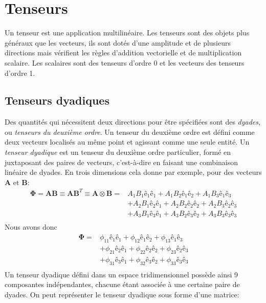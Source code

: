 \section{Tenseurs}
Un tenseur est une application multilinéaire. Les tenseurs sont des objets plus généraux que les vecteurs, ils sont dotés d'une amplitude et de plusieurs directions mais vérifient les règles d'addition vectorielle et de multiplication scalaire. Les scalaires sont des tenseurs d'ordre 0 et les vecteurs des tenseurs d'ordre 1.
\subsection{Tenseurs dyadiques}
Des quantités qui nécessitent deux directions pour être spécifiées sont des \emph{dyades}, ou \textit{tenseurs du deuxième ordre}. Un tenseur du deuxième ordre est défini comme deux vecteurs localisés au même point et agissant comme une seule entité. Un \emph{tenseur dyadique} est un tenseur du deuxième ordre particulier, formé en juxtaposant des paires de vecteurs, c'est-à-dire en faisant une combinaison linéaire de dyades. En trois dimensions cela donne par exemple, pour des vecteurs \textbf{A} et \textbf{B}:
\begin{equation*}
\begin{array}{cc}
\mathbf{\Phi}=\textbf{A}\textbf{B}\equiv \textbf{A}\textbf{B}^T\equiv\textbf{A}\otimes\textbf{B}=&A_1B_1\textbf{ê}_1\textbf{ê}_1+A_1B_2\textbf{ê}_1\textbf{ê}_2+A_1B_3\textbf{ê}_1\textbf{ê}_3\\
 &+A_2B_1\textbf{ê}_2\textbf{ê}_1+A_2B_2\textbf{ê}_2\textbf{ê}_2+A_2B_3\textbf{ê}_2\textbf{ê}_3\\
 &+A_3B_1\textbf{ê}_3\textbf{ê}_1+A_3B_2\textbf{ê}_3\textbf{ê}_2+A_3B_3\textbf{ê}_3\textbf{ê}_3\\
\end{array}
\end{equation*} 
Nous avons donc $$\begin{array}{cc}
\mathbf{\Phi}=&\phi_{11}\textbf{ê}_1\textbf{ê}_1+\phi_{12}\textbf{ê}_1\textbf{ê}_2+\phi_{13}\textbf{ê}_1\textbf{ê}_3\\
 &+\phi_{21}\textbf{ê}_2\textbf{ê}_1+\phi_{22}\textbf{ê}_2\textbf{ê}_2+\phi_{23}\textbf{ê}_2\textbf{ê}_3\\
 &+\phi_{31}\textbf{ê}_3\textbf{ê}_1+\phi_{32}\textbf{ê}_3\textbf{ê}_2+\phi_{33}\textbf{ê}_3\textbf{ê}_3\\
\end{array}$$
Un tenseur dyadique défini dans un espace tridimensionnel possède ainsi 9 composantes indépendantes, chacune étant associée à une certaine paire de dyades. On peut représenter le tenseur dyadique sous forme d'une matrice:
